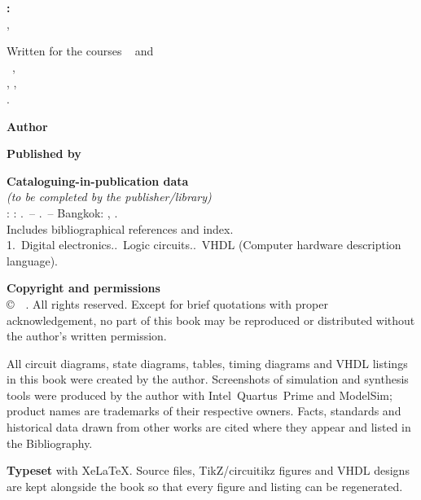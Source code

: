\thispagestyle{empty}
\vspace*{\fill}
\begingroup\small{}
\textbf{\BookTitle: \BookSubtitle}\\
\Edition, \PubYear

\medskip
Written for the courses \CourseCode\ \emph{\CourseName} and\\
\CourseCodeB\ \emph{\CourseNameB},\\
\AuthorDept, \AuthorFaculty,\\ \AuthorUni.

\bigskip
\textbf{Author}\quad \AuthorFull

\medskip
\textbf{Published by}\quad \PublisherText

\medskip
\textbf{\ISBNtext}

\bigskip
\textbf{Cataloguing-in-publication data}\\
\textit{(to be completed by the publisher/library)}\\[2pt]
\AuthorName: \BookTitle: \BookSubtitle.\ -- \Edition.\ -- Bangkok: \AuthorUni, \PubYear.\\
Includes bibliographical references and index.\\
1.\ Digital electronics..\ Logic circuits..\ VHDL (Computer hardware description language).

\bigskip
\textbf{Copyright and permissions}\\
\copyright\ \PubYear\ \AuthorName. All rights reserved. Except for brief quotations with proper
acknowledgement, no part of this book may be reproduced or distributed without the author's written permission.

All circuit diagrams, state diagrams, tables, timing diagrams and VHDL listings in this book were
created by the author. Screenshots of simulation and synthesis tools were produced by the author with
Intel\textregistered\ Quartus\textregistered\ Prime and ModelSim; product names are trademarks of their respective owners.
Facts, standards and historical data drawn from other works are cited where they appear and listed in the Bibliography.

\bigskip
\textbf{Typeset} with XeLaTeX. Source files, TikZ/circuitikz figures and VHDL designs are kept alongside the book so that every figure and listing can be regenerated.
\endgroup
\clearpage
